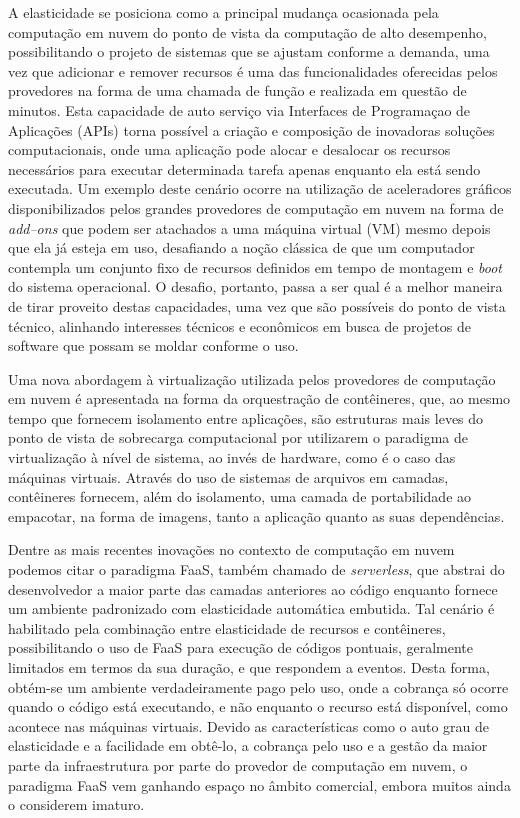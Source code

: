 \documentclass[english,brazilian]{UNISINOSmonografia} %
\begin{document}
A elasticidade se posiciona como a principal mudança ocasionada pela computação em nuvem do ponto de vista da computação de alto desempenho, possibilitando o projeto de sistemas que se ajustam conforme a demanda, uma vez que adicionar e remover recursos é uma das funcionalidades oferecidas pelos provedores na forma de uma chamada de função e realizada em questão de minutos.
Esta capacidade de auto serviço via Interfaces de Programaçao de Aplicações (APIs) torna possível a criação e composição de inovadoras soluções computacionais, onde uma aplicação pode alocar e desalocar os recursos necessários para executar determinada tarefa apenas enquanto ela está sendo executada.
Um exemplo deste cenário ocorre na utilização de aceleradores gráficos disponibilizados pelos grandes provedores de computação em nuvem na forma de \textit{add--ons} que podem ser atachados a uma máquina virtual (VM) mesmo depois que ela já esteja em uso, desafiando a noção clássica de que um computador contempla um conjunto fixo de recursos definidos em tempo de montagem e \textit{boot} do sistema operacional.
O desafio, portanto, passa a ser qual é a melhor maneira de tirar proveito destas capacidades, uma vez que são possíveis do ponto de vista técnico, alinhando interesses técnicos e econômicos em busca de projetos de software que possam se moldar conforme o uso.


Uma nova abordagem à virtualização utilizada pelos provedores de computação em nuvem é apresentada na forma da orquestração de contêineres, que, ao mesmo tempo que fornecem isolamento entre aplicações, são estruturas mais leves do ponto de vista de sobrecarga computacional por utilizarem o paradigma de virtualização à nível de sistema, ao invés de hardware, como é o caso das máquinas virtuais.
Através do uso de sistemas de arquivos em camadas, contêineres fornecem, além do isolamento, uma camada de portabilidade ao empacotar, na forma de imagens, tanto a aplicação quanto as suas dependências.


Dentre as mais recentes inovações no contexto de computação em nuvem podemos citar o paradigma FaaS, também chamado de \textit{serverless}, que abstrai do desenvolvedor a maior parte das camadas anteriores ao código enquanto fornece um ambiente padronizado com elasticidade automática embutida.
Tal cenário é habilitado pela combinação entre elasticidade de recursos e contêineres, possibilitando o uso de FaaS para execução de códigos pontuais, geralmente limitados em termos da sua duração, e que respondem a eventos.
Desta forma, obtém-se um ambiente verdadeiramente pago pelo uso, onde a cobrança só ocorre quando o código está executando, e não enquanto o recurso está disponível, como acontece nas máquinas virtuais.
Devido as características como o auto grau de elasticidade e a facilidade em obtê-lo, a cobrança pelo uso e a gestão da maior parte da infraestrutura por parte do provedor de computação em nuvem, o paradigma FaaS vem ganhando espaço no âmbito comercial, embora muitos ainda o considerem imaturo.
\end{document}
